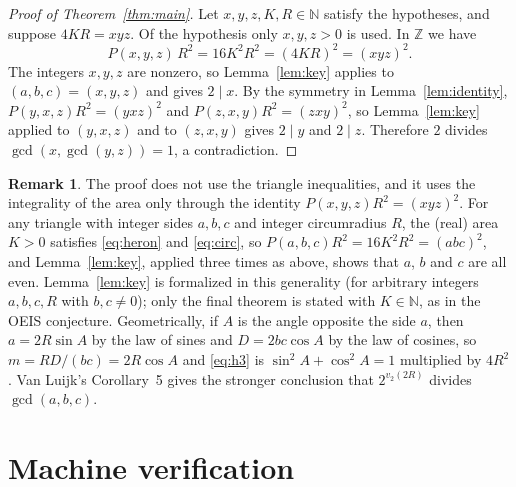 \documentclass[11pt]{amsart}
\theoremstyle{plain}
\theoremstyle{definition}
\newtheorem{remark}[theorem]{Remark}
\newcommand{\N}{\mathbb{N}}
\newcommand{\Z}{\mathbb{Z}}
\begin{document}
\begin{proof}[Proof of Theorem~\ref{thm:main}]
Let $x,y,z,K,R\in\N$ satisfy the hypotheses, and suppose $4KR=xyz$. Of the hypothesis  only $x,y,z>0$ is used. In $\Z$ we have
\[
  P(x,y,z)\,R^2=16K^2R^2=(4KR)^2=(xyz)^2 .
\]
The integers $x,y,z$ are nonzero, so Lemma~\ref{lem:key} applies to $(a,b,c)=(x,y,z)$ and gives $2\mid x$. By the symmetry in Lemma~\ref{lem:identity}, $P(y,x,z)R^2=(yxz)^2$ and $P(z,x,y)R^2=(zxy)^2$, so Lemma~\ref{lem:key} applied to $(y,x,z)$ and to $(z,x,y)$ gives $2\mid y$ and $2\mid z$. Therefore $2$ divides $\gcd(x,\gcd(y,z))=1$, a contradiction.
\end{proof}

\begin{remark}\label{rem:general}
The proof does not use the triangle inequalities, and it uses the integrality of the area only through the identity $P(x,y,z)R^2=(xyz)^2$. For any triangle with integer sides $a,b,c$ and integer circumradius $R$, the (real) area $K>0$ satisfies \eqref{eq:heron} and \eqref{eq:circ}, so $P(a,b,c)R^2=16K^2R^2=(abc)^2$, and Lemma~\ref{lem:key}, applied three times as above, shows that $a$, $b$ and $c$ are all even. Lemma~\ref{lem:key} is formalized in this generality (for arbitrary integers $a,b,c,R$ with $b,c\neq 0$); only the final theorem is stated with $K\in\N$, as in the OEIS conjecture. Geometrically, if $A$ is the angle opposite the side $a$, then $a=2R\sin A$ by the law of sines and $D=2bc\cos A$ by the law of cosines, so $m=RD/(bc)=2R\cos A$ and \eqref{eq:h3} is $\sin^2A+\cos^2A=1$ multiplied by $4R^2$. Van Luijk's Corollary~5 \cite{vL} gives the stronger conclusion that $2^{v_2(2R)}$ divides $\gcd(a,b,c)$.
\end{remark}

\section{Machine verification}\label{sec:lean}
\end{document}
